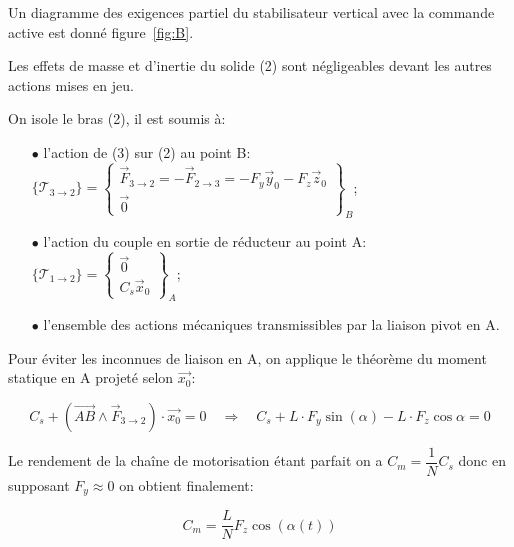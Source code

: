 Un diagramme des exigences partiel du stabilisateur vertical avec la commande active est donné figure~\ref{fig:B}.%

Les effets de masse et d'inertie du solide (2) sont négligeables devant les autres actions mises en jeu.
\fi




\ifprof
\begin{corrige}
On isole le bras (2), il est soumis à:
\begin{itemize}
\item[$\bullet$] l'action de (3) sur (2) au point B: $\{ \mathcal{T}_{3\to2} \} = \begin{Bmatrix} \overrightarrow{F}_{3\to2} = -\overrightarrow{F}_{2\to3} = -F_y \vec{y}_0 - F_z \vec{z}_0 \\ \overrightarrow{0} \end{Bmatrix}_B$;
\item[$\bullet$] l'action du couple en sortie de réducteur au point A: $\{ \mathcal{T}_{1\to2} \} = \begin{Bmatrix} \overrightarrow{0}  \\ C_s \vec{x}_0 \end{Bmatrix}_A$;
\item[$\bullet$] l'ensemble des actions mécaniques transmissibles par la liaison pivot en A.
\end{itemize}

Pour éviter les inconnues de liaison en A, on applique le théorème du moment statique en A projeté selon $\overrightarrow{x_0}$:

$$ C_s + (\overrightarrow{AB} \wedge \overrightarrow{F}_{3 \to 2})\cdot \overrightarrow{x_0} = 0 \quad \Rightarrow \quad C_s + L\cdot F_y\sin(\alpha) - L\cdot F_z\cos{\alpha} = 0 $$

Le rendement de la chaîne de motorisation étant parfait on a $C_m = \dfrac{1}{N}C_s$ donc en supposant $F_y \approx 0$ on obtient finalement:

$$ \boxed{C_m = \dfrac{L}{N}F_z\cos(\alpha(t))} $$
\end{corrige}
\else
\fi

